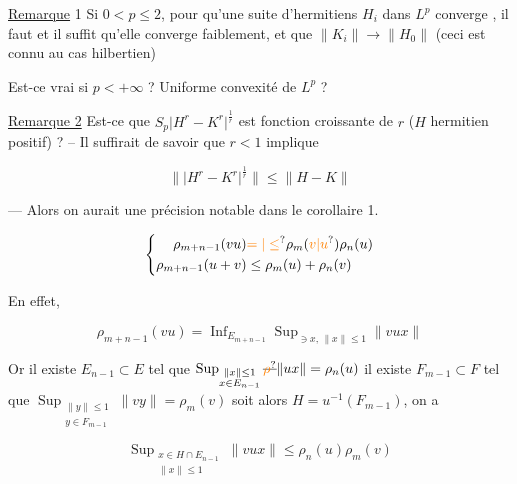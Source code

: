 \uline{Remarque} 1 Si $0<p\leq2$, pour qu'une suite d'hermitiens $H_i$ dans $L^p$ converge , il faut et il suffit qu'elle converge faiblement, et que $\|K_i\|\to\|H_0\|$ (ceci est connu au cas hilbertien)


Est-ce vrai si $p<+\infty$ ? Uniforme convexité de $L^p$ ?

\uline{Remarque 2} Est-ce que $S_p\lvert H^r-K^r\rvert^{\frac1r}$ est fonction croissante de $r$ ($H$ hermitien positif) ? -- Il suffirait de savoir que $r<1$ implique

\[
\bigl\|\lvert H^r-K^r\rvert^{\frac1r}\bigr\|\leq\|H-K\|
\]

--- Alors on aurait une précision notable dans le corollaire 1.

\[
\left\{\begin{aligned}
\rho_{m+n-1}(vu)&\unsure{=|\leq}\rho_m(\unsure{v|u})\rho_n(u)\\
\rho_{m+n-1}(u+v)&\leq\rho_m(u)+\rho_n(v)
\end{aligned}\right.
\]

En effet,

\[
\rho_{m+n-1}(vu)=\mathop{\mathrm{Inf}}_{E_{m+n-1}}
\mathop{\mathrm{Sup}}_{\ni x,\,\|x\|\leq1}\|vu x\|
\]


Or il existe $E_{n-1}\subset E$ tel que $\mathop{\mathrm{Sup}}_{\substack{\|x\|\leq1\\x\in E_{n-1}}}\deleted{\unsure{\rho}}\|ux\|=\rho_n(u)$  il existe $F_{m-1}\subset F$ tel que $\mathop{\mathrm{Sup}}_{\substack{\|y\|\leq1\\y\in F_{m-1}}}\|vy\|=\rho_m(v)$ soit alors $H=u^{-1}(F_{m-1})$, on a


\[
\mathop{\mathrm{Sup}}_{\substack{x\in H\cap E_{n-1}\\\|x\|\leq1}}\|vux\|\leq\rho_n(u)\rho_m(v)
\]


